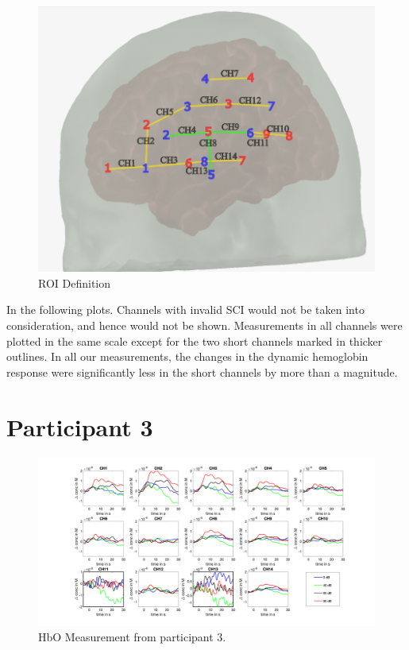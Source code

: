 \vspace{1cm}
\begin{figure}[H]
  \centering
    \includegraphics[scale=.45]{bilder/optode_roi_ink.png}
  \caption{ROI Definition}
\end{figure}


In the following plots. Channels with invalid SCI would not be taken into consideration, and hence would not be shown. Measurements in all channels were plotted in the same scale except for the two short channels marked in thicker outlines. In all our measurements, the changes in the dynamic hemoglobin response were significantly less in the short channels by more than a magnitude.
\newpage



\section {Participant 3}

\begin{figure}[H]
  \centering
    \includegraphics[scale=.4]{bilder/HbO_Mole/sub_jonas_s_HbO.png}
  \caption{HbO Measurement from participant 3.}
  \label{fig:somesignal}
\end{figure}

